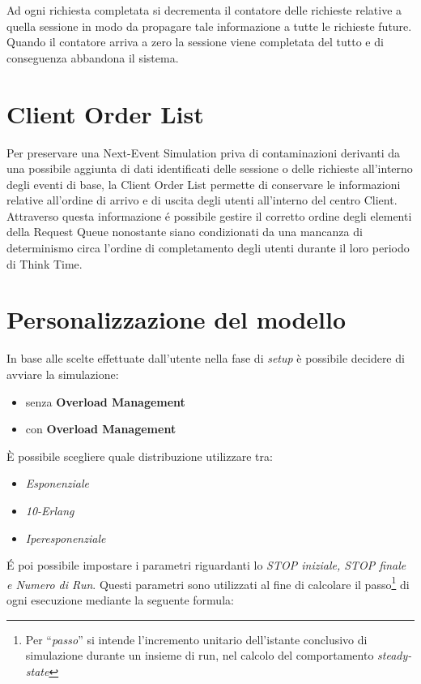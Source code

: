 Ad ogni richiesta completata si decrementa il contatore delle richieste relative a quella sessione in modo da propagare tale informazione a tutte le richieste future. Quando il contatore arriva a zero la sessione viene completata del tutto e di conseguenza abbandona il sistema.

\section{Client Order List}
Per preservare una Next-Event Simulation priva di contaminazioni derivanti da una possibile aggiunta di dati identificati delle sessione o delle richieste all'interno degli eventi di base, la Client Order List permette di conservare le informazioni relative all'ordine di arrivo e di uscita  degli utenti all'interno del centro Client. Attraverso questa informazione \'e possibile gestire il corretto ordine degli elementi della Request Queue nonostante siano condizionati da una mancanza di determinismo circa l'ordine di completamento degli utenti durante il loro periodo di Think Time.


\section{Personalizzazione del modello}
In base alle scelte effettuate dall'utente nella fase di \textit{setup} è possibile decidere di avviare la simulazione:
\begin{itemize}
\item senza \textbf{Overload Management}
\item con \textbf{Overload Management}
\end{itemize}
 
\noindent È possibile scegliere quale distribuzione utilizzare tra:
\begin{itemize}
\item \textit{Esponenziale}
\item \textit{10-Erlang}
\item \textit{Iperesponenziale}
\end{itemize}

\noindent \'E poi possibile impostare i parametri riguardanti lo \textit{STOP iniziale, STOP finale e Numero di Run}. Questi parametri sono utilizzati al fine di calcolare il passo\footnote{Per ``\textit{passo}'' si intende l'incremento unitario dell'istante conclusivo di simulazione durante un insieme di run, nel calcolo del comportamento \textit{steady-state}} di ogni esecuzione mediante la seguente formula:

